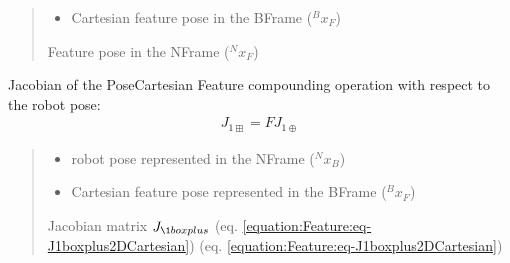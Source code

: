 \documentclass[letterpaper,10pt,english]{sphinxmanual}
\begin{document}
\begin{fulllineitems}
\begin{fulllineitems}
\begin{quote}
\begin{description}
\begin{itemize}
\item {} 
\sphinxAtStartPar
{} \textendash{} Cartesian feature pose in the B\sphinxhyphen{}Frame (\(^Bx_F\))

\end{itemize}

\sphinxAtStartPar
Feature pose in the N\sphinxhyphen{}Frame (\(^Nx_F\))

\end{description}\end{quote}

\end{fulllineitems}


\begin{fulllineitems}
\label{\detokenize{Feature:Feature.CartesianFeature.J_1boxplus}}
\pysigstartsignatures
{}
\pysigstopsignatures
\sphinxAtStartPar
Jacobian of the Pose\sphinxhyphen{}Cartesian Feature compounding operation with respect to the robot pose:
\begin{equation}\label{equation:Feature:eq-J1boxplus2DCartesian}
\begin{split}J_{1\boxplus} = F J_{1\oplus}\end{split}
\end{equation}\begin{quote}\begin{description}
\begin{itemize}
\item {} 
\sphinxAtStartPar
{} \textendash{} robot pose represented in the N\sphinxhyphen{}Frame (\(^Nx_B\))

\item {} 
\sphinxAtStartPar
{} \textendash{} Cartesian feature pose represented in the B\sphinxhyphen{}Frame (\(^Bx_F\))

\end{itemize}

\sphinxAtStartPar
Jacobian matrix \(J_{\1boxplus}\) (eq. \eqref{equation:Feature:eq-J1boxplus2DCartesian}) (eq. \eqref{equation:Feature:eq-J1boxplus2DCartesian})

\end{description}\end{quote}


\end{fulllineitems}
\end{fulllineitems}
\end{document}
